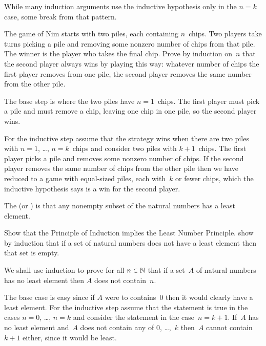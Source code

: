 \documentclass{test}  %
\begin{document}
While many induction arguments use the inductive 
hypothesis only in the $n=k$ case,
some break from that pattern.

\begin{problem}
The game of Nim starts with two piles, each containing $n$~chips.
Two players take turns picking a pile and removing 
some nonzero number of chips from that pile. 
The winner is the player who takes the final chip.
Prove by induction on~$n$ that the second player always wins by
playing this way: whatever number of chips the first player removes
from one pile, the second player removes the same number from the other pile.
\begin{answer}
The base step is where the two piles have $n=1$~chips.
The first player must pick a pile and must remove a chip, leaving one chip
in one pile, so the second player wins.

For the inductive step assume that the strategy wins when there are two piles
with $n=1$, \ldots, $n=k$~chips and consider two piles with
$k+1$~chips.
The first player picks a pile and removes some nonzero number of chips.
If the second player removes the same number of chips from the other
pile then we have reduced to a game with equal-sized piles, each
with~$k$ or fewer chips, which the inductive hypothesis says
is a win for the second player.  
\end{answer}
\end{problem}

\begin{df}
The  
(or )
is that any nonempty 
subset of the natural
numbers has a least element.  
\end{df}

\begin{problem}
Show that the Principle of Induction implies the Least Number 
Principle.
\hint
show by induction that if a set of natural numbers does not
have a least element then that set is empty.
\begin{answer}
We shall use induction to prove for all $n\in\mathbb{N}$ that if a set~$A$ 
of natural numbers has no
least element then $A$ does not contain~$n$.

The base case is easy since if $A$ were to contains~$0$ then it would
clearly have a least element.
For the inductive step assume that the statement is true in the cases
$n=0$, \ldots, $n=k$ and consider the statement in the case~$n=k+1$.
If~$A$ has no least element and~$A$ does not contain any of $0$, \ldots,~$k$ 
then~$A$ cannot contain~$k+1$ either, since it would be least.   
\end{answer}
\end{problem}
\end{document}
